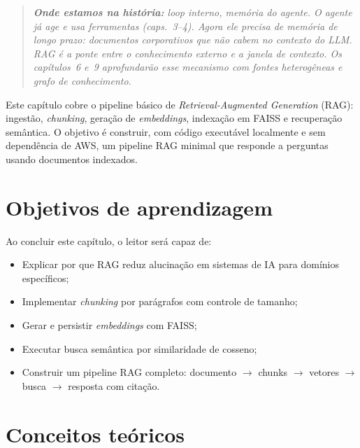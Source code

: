 \begin{quote}\itshape
\textbf{Onde estamos na hist\'oria:} loop interno, mem\'oria do agente.
O agente j\'a age e usa ferramentas (caps.~3--4). Agora ele precisa
de mem\'oria de longo prazo: documentos corporativos que n\~ao cabem
no contexto do LLM. RAG \'e a ponte entre o conhecimento externo e
a janela de contexto. Os cap\'itulos~6 e~9 aprofundar\~ao esse
mecanismo com fontes heterog\^eneas e grafo de conhecimento.
\end{quote}

Este cap\'itulo cobre o pipeline b\'asico de
\textit{Retrieval-Augmented Generation}
(RAG): ingest\~ao, \textit{chunking}, gera\c{c}\~ao de
\textit{embeddings}, indexa\c{c}\~ao em FAISS e recupera\c{c}\~ao
sem\^antica. O objetivo \'e construir, com c\'odigo execut\'avel
localmente e sem depend\^encia de AWS, um pipeline RAG minimal
que responde a perguntas usando documentos indexados.

\section{Objetivos de aprendizagem}

Ao concluir este cap\'itulo, o leitor ser\'a capaz de:

\begin{itemize}[leftmargin=*]
  \item Explicar por que RAG reduz alucina\c{c}\~ao em sistemas
        de IA para dom\'inios espec\'ificos;
  \item Implementar \textit{chunking} por par\'agrafos com controle
        de tamanho;
  \item Gerar e persistir \textit{embeddings} com FAISS;
  \item Executar busca sem\^antica por similaridade de cosseno;
  \item Construir um pipeline RAG completo: documento $\to$ chunks
        $\to$ vetores $\to$ busca $\to$ resposta com cita\c{c}\~ao.
\end{itemize}

\section{Conceitos te\'oricos}

